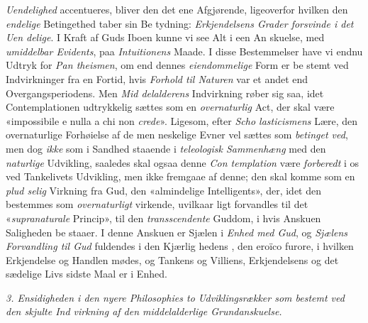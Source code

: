 \emph{Uendelighed} accentueres, bliver den det ene Afgjørende,
ligeoverfor hvilken den \emph{endelige} Betingethed taber sin Be\-%
tydning: \emph{Erkjendelsens Grader forsvinde i det Uen\-%
delige}. I Kraft af Guds Iboen kunne vi see Alt i een An\-%
skuelse, med \emph{umiddelbar Evidents}, paa \emph{Intuitionens}
Maade. I disse Bestemmelser have vi endnu Udtryk for \emph{Pan\-%
theismen}, om end dennes \emph{eiendommelige} Form er be\-%
stemt ved Indvirkninger fra en Fortid, hvis \emph{Forhold til
Naturen} var et andet end Overgangsperiodens. Men \emph{Mid\-%
delalderens} Indvirkning røber sig saa, idet Contemplationen
udtrykkelig sættes som en \emph{overnaturlig} Act, der skal være
«impossibile e nulla a chi non \emph{crede}». Ligesom, efter \emph{Scho\-%
lasticismens} Lære, den overnaturlige Forhøielse af de men\-%
neskelige Evner vel sættes som \emph{betinget ved}, men dog \emph{ikke}
som i Sandhed staaende i \emph{teleologisk Sammenhæng} med
den \emph{naturlige} Udvikling, saaledes skal ogsaa denne \emph{Con\-%
templation} være \emph{forberedt} i os ved Tankelivets Udvikling,
men ikke fremgaae af denne; den skal komme som en \emph{plud\-%
selig} Virkning fra Gud, den «almindelige Intelligents», der,
idet den bestemmes som \emph{overnaturligt} virkende, uvilkaar\-%
ligt forvandles til det «\emph{supranaturale} Princip», til den
\emph{transscendente} Guddom, i hvis Anskuen Saligheden be\-%
staaer. I denne Anskuen er Sjælen i \emph{Enhed med Gud}, og
\emph{Sjælens Forvandling til Gud} fuldendes i den Kjærlig\-%
hedens , den eroïco furore, i hvilken Erkjendelse og
Handlen mødes, og Tankens og Villiens, Erkjendelsens og det
sædelige Livs sidste Maal er i Enhed.

\divrule

\emph{3. Ensidigheden i den nyere Philosophies to
Udviklingsrækker som bestemt ved den skjulte Ind\-%
virkning af den middelalderlige Grundanskuelse.}

